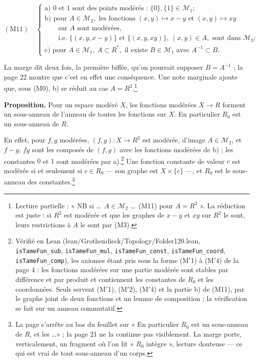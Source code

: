 \documentclass[11pt,a4paper]{article}
\begin{document}
\[ (\mathrm{M}11) \quad
\begin{cases}
\text{a) } 0 \text{ et } 1 \text{ sont des points modérés : } \{0\}, \{1\} \in
\mathcal{M}_1 ; \\
\text{b) pour } A \in \mathcal{M}_2, \text{ les fonctions } (x,y) \mapsto x - y
\text{ et } (x,y) \mapsto xy \\
\qquad \text{sur } A \text{ sont modérées,} \\
\qquad \text{i.e.\ } \{(x, y, x-y)\} \text{ et } \{(x, y, xy)\},\ (x,y) \in A,
\text{ sont dans } \mathcal{M}_3 ; \\
\text{c) pour } A \in \mathcal{M}_1,\ A \subset R^*, \text{ il existe } B \in
\mathcal{M}_1 \text{ avec } A^{-1} \subset B .
\end{cases} \]

La marge dit deux fois, la première biffée, qu'on pourrait supposer $B =
A^{-1}$ ; la page 22 montre que c'est en effet une conséquence. Une note
marginale ajoute que, sous (M0), b) se réduit au cas $A = R^2$.\footnote{Lecture
partielle : « NB si \ldots\ $A \in \mathcal{M}_2$ \ldots\ (M11) pour $A =
R^2$ ». La réduction est juste : si $R^2$ est modérée et que les graphes de
$x - y$ et $xy$ sur $R^2$ le sont, leurs restrictions à $A$ le sont par (M3).}

\textbf{Proposition.} Pour un espace modéré $X$, les fonctions modérées $X \to
R$ forment un sous-anneau de l'anneau de toutes les fonctions sur $X$. En
particulier $R_0$ est un sous-anneau de $R$.

En effet, pour $f, g$ modérées, $(f, g) : X \to R^2$ est modérée, d'image $A
\in \mathcal{M}_2$, et $f - g$, $fg$ sont les composés de $(f,g)$ avec les
fonctions modérées de b) ; les constantes $0$ et $1$ sont modérées par a).\footnote{Vérifié en
Lean (lean/Grothendieck/Topology/Folder120.lean, \texttt{isTameFun\_sub},
\texttt{isTameFun\_mul}, \texttt{isTameFun\_const}, \texttt{isTameFun\_coord},
\texttt{isTameFun\_comp}), les axiomes étant pris sous la forme (M$'$1) à
(M$'$4) de la page 4 : les fonctions modérées sur une partie modérée sont
stables par différence et par produit et contiennent les constantes de $R_0$ et
les coordonnées. Seuls servent (M$'$1), (M$'$2), (M$'$4) et la partie b) de
(M11), par le graphe joint de deux fonctions et un lemme de composition ; la
vérification se fait sur un anneau commutatif.} Une
fonction constante de valeur $c$ est modérée si et seulement si $c \in R_0$ —
son graphe est $X \times \{c\}$ —, et $R_0$ est le sous-anneau des
constantes.\footnote{La page s'arrête au bas du feuillet sur « En particulier
$R_0$ est un sous-anneau de $R$, et les \ldots » ; la page 21 ne la continue
pas visiblement. La marge porte, verticalement, un fragment où l'on lit
« $R_0$ intègre », lecture douteuse — ce qui est vrai de tout sous-anneau d'un
corps.}
\end{document}
